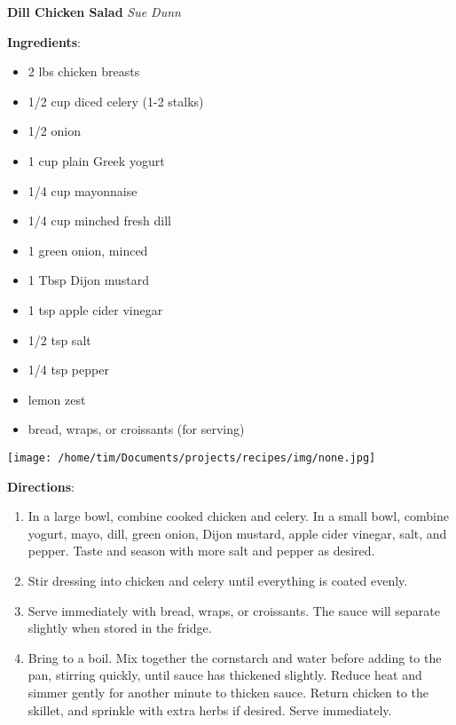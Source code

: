 \documentclass[11pt, twoside, openany]{book}
\begin{document}
\noindent\begin{minipage}[t]{\linewidth}%
{\Large\textbf{Dill Chicken Salad}} \label{dill-chicken-salad}\hfill\textit{Sue Dunn}\\
\noindent\begin{minipage}[t]{0.78\linewidth}%
\textbf{Ingredients}:\vspace{-3mm}
\begin{multicols}{2}
\begin{itemize}\setlength\itemsep{-1mm}
\item 2 lbs chicken breasts
\item 1/2 cup diced celery (1-2 stalks)
\item 1/2 onion
\item 1 cup plain Greek yogurt
\item 1/4 cup mayonnaise
\item 1/4 cup minched fresh dill
\item 1 green onion, minced
\item 1 Tbsp Dijon mustard
\item 1 tsp apple cider vinegar
\item 1/2 tsp salt
\item 1/4 tsp pepper
\item lemon zest
\item bread, wraps, or croissants (for serving)
\end{itemize}
\end{multicols}
\end{minipage}
\noindent\begin{minipage}[t]{0.18\linewidth}
\centering \strut\vspace*{-\baselineskip}\newline
\texttt{[image: /home/tim/Documents/projects/recipes/img/none.jpg]}\\
\end{minipage}\vspace{3mm}
\textbf{Directions}:
\vspace{-3mm}\begin{enumerate}\setlength\itemsep{-1mm}
\item In a large bowl, combine cooked chicken and celery. In a small bowl, combine yogurt, mayo, dill, green onion, Dijon mustard, apple cider vinegar, salt, and pepper. Taste and season with more salt and pepper as desired.
\item Stir dressing into chicken and celery until everything is coated evenly.
\item Serve immediately with bread, wraps, or croissants. The sauce will separate slightly when stored in the fridge.
\item Bring to a boil. Mix together the cornstarch and water before adding to the pan, stirring quickly, until sauce has thickened slightly. Reduce heat and simmer gently for another minute to thicken sauce. Return chicken to the skillet, and sprinkle with extra herbs if desired. Serve immediately.
\end{enumerate}
\end{minipage}\vspace{8mm}
\end{document}
